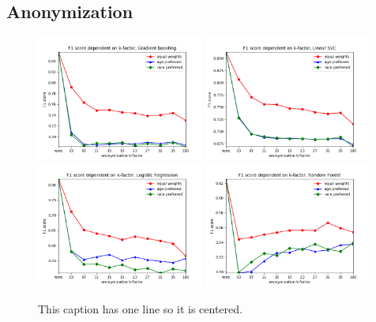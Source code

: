 \documentclass[a4paper,twoside]{article}
\begin{document}


\subsection{Anonymization}

\begin{figure}[!h]
	\centering
	\includegraphics[width=0.49\textwidth]{figures/anonymization/adults_marital_status/gradient_boost}
	\includegraphics[width=0.49\textwidth]{figures/anonymization/adults_marital_status/linear_svc}
	\includegraphics[width=0.49\textwidth]{figures/anonymization/adults_marital_status/logistic_regression}
	\includegraphics[width=0.49\textwidth]{figures/anonymization/adults_education_num/random_forest}
	\caption{This caption has one line so it is centered.}
	\label{fig:results_anonymization_marital_status}
\end{figure}
\end{document}
